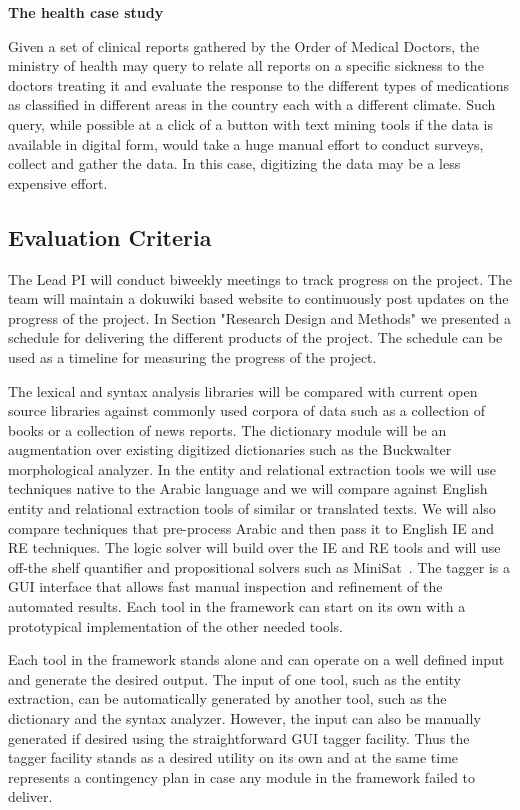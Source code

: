 \documentclass[12pt]{article}
\begin{document}
{\bf The health case study}

Given a set of clinical reports gathered by the Order of Medical Doctors, the ministry of health may query to relate all reports on a specific sickness to the doctors treating it and evaluate the response to the different types of medications as classified in different areas in the country each with a different climate.
 Such query, while possible at a click of a button with text mining tools if the data is available in digital form, would take a huge manual effort to conduct surveys, collect and gather the data.
 In this case, digitizing the data may be a less expensive effort.

\subsection{Evaluation Criteria}

The Lead PI will conduct biweekly meetings to track progress on the project.
 The team will maintain a dokuwiki based website to continuously post updates on the progress of the project.
 In Section "Research Design and Methods" we presented a schedule for delivering the different products of the project.
 The schedule can be used as a timeline for measuring the progress of the project.

The lexical and syntax analysis libraries will be compared with current open source libraries against commonly used corpora of data such as a collection of books or a collection of news reports.
 The dictionary module will be an augmentation over existing digitized dictionaries such as the Buckwalter~\cite{Tim04} morphological analyzer.
 In the entity and relational extraction tools we will use techniques native to the Arabic language and we will compare against English entity and relational extraction tools of similar or translated texts.
 We will also compare techniques that pre-process Arabic and then pass it to English IE and RE techniques.
 The logic solver will build over the IE and RE tools and will use off-the shelf quantifier and propositional solvers such as MiniSat~\cite{Een03}.
 The tagger is a GUI interface that allows fast manual inspection and refinement of the automated results.
 Each tool in the framework can start on its own with a prototypical implementation of the other needed tools.
 
Each tool in the framework stands alone and can operate on a well defined input and generate the desired output.
 The input of one tool, such as the entity extraction, can be automatically generated by another tool, such as the dictionary and the syntax analyzer.
  However, the input can also be manually generated if desired using the straightforward GUI tagger facility.
 Thus the tagger facility stands as a desired utility on its own and at the same time represents a contingency plan in case any module in the framework failed to deliver.
 
\end{document}
